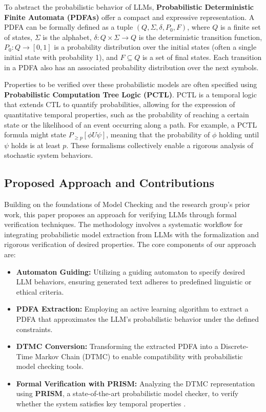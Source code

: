 \documentclass{article}
\begin{document}
To abstract the probabilistic behavior of LLMs, \textbf{Probabilistic Deterministic Finite Automata (PDFAs)} offer a compact and expressive representation. A PDFA can be formally defined as a tuple $(Q, \Sigma, \delta, P_0, F)$, where $Q$ is a finite set of states, $\Sigma$ is the alphabet, $\delta: Q \times \Sigma \to Q$ is the deterministic transition function, $P_0: Q \to [0,1]$ is a probability distribution over the initial states (often a single initial state with probability 1), and $F \subseteq Q$ is a set of final states. Each transition in a PDFA also has an associated probability distribution over the next symbols.

Properties to be verified over these probabilistic models are often specified using \textbf{Probabilistic Computation Tree Logic (PCTL)}. PCTL is a temporal logic that extends CTL to quantify probabilities, allowing for the expression of quantitative temporal properties, such as the probability of reaching a certain state or the likelihood of an event occurring along a path. For example, a PCTL formula might state $P_{\ge p}[\phi U \psi]$, meaning that the probability of $\phi$ holding until $\psi$ holds is at least $p$. These formalisms collectively enable a rigorous analysis of stochastic system behaviors.

\subsection{Proposed Approach and Contributions}

Building on the foundations of Model Checking and the research group's prior work, this paper proposes an approach for verifying LLMs through formal verification techniques. The methodology involves a systematic workflow for integrating probabilistic model extraction from LLMs with the formalization and rigorous verification of desired properties. The core components of our approach are:


\begin{itemize}
    \item \textbf{Automaton Guiding:} Utilizing a guiding automaton to specify desired LLM behaviors, ensuring generated text adheres to predefined linguistic or ethical criteria.
    \item \textbf{PDFA Extraction:} Employing an active learning algorithm to extract a PDFA that approximates the LLM's probabilistic behavior under the defined constraints.
    \item \textbf{DTMC Conversion:} Transforming the extracted PDFA into a Discrete-Time Markov Chain (DTMC) to enable compatibility with probabilistic model checking tools.
    \item \textbf{Formal Verification with PRISM:} Analyzing the DTMC representation using \textbf{PRISM}, a state-of-the-art probabilistic model checker, to verify whether the system satisfies key temporal properties \cite{KNP11}.
\end{itemize}
\end{document}
